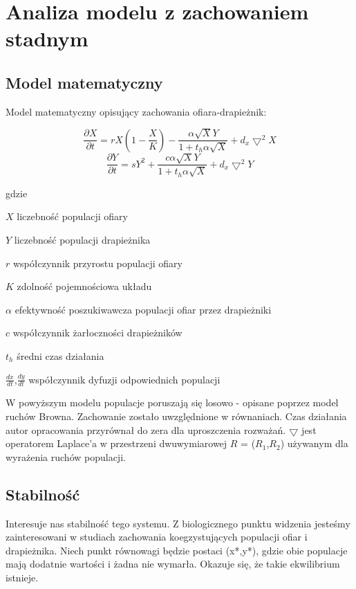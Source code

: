 \chapter{Analiza modelu z zachowaniem stadnym}
\label{cha:spatial}

\section{Model matematyczny}

Model matematyczny opisujący zachowania ofiara-drapieżnik:

$$ \frac{\partial X}{\partial t} = rX(1-\frac{X}{K})-\frac{\alpha\sqrt{X}Y}{1+t_h \alpha\sqrt{X}}+d_x \bigtriangledown^2 X $$
$$ \frac{\partial Y}{\partial t} = sY^2+\frac{c\alpha\sqrt{X}Y}{1+t_h \alpha\sqrt{X}}+d_x \bigtriangledown^2 Y $$

gdzie 

\begin{eqwhere}[2cm]
	\item[$X$] liczebność populacji ofiary
	\item[$Y$] liczebność populacji drapieżnika
	\item[$r$] współczynnik przyrostu populacji ofiary
	\item[$K$] zdolność pojemnościowa układu
	\item[$\alpha$] efektywność poszukiwawcza populacji ofiar przez drapieżniki
	\item[$c$] współczynnik żarłoczności drapieżników
	\item[$t_h$] średni czas działania
	\item[$\frac{dx}{dt}$,$\frac{dy}{dt}$] współczynnik dyfuzji odpowiednich populacji
\end{eqwhere}

\noindent W powyższym modelu populacje poruszają się losowo - opisane poprzez model ruchów Browna. Zachowanie zostało uwzględnione w równaniach. Czas działania autor opracowania przyrównał do zera dla uproszczenia rozważań. $\bigtriangledown$ jest operatorem Laplace'a w przestrzeni dwuwymiarowej $R$ = ($R_1$,$R_2$) używanym dla wyrażenia ruchów populacji.

\section{Stabilność}

\noindent Interesuje nas stabilność tego systemu. Z biologicznego punktu widzenia jesteśmy zainteresowani w studiach zachowania koegzystujących populacji ofiar i drapieżnika. Niech punkt równowagi będzie postaci (x*,y*), gdzie obie populacje mają dodatnie wartości i żadna nie wymarła. Okazuje się, że takie ekwilibrium istnieje.

